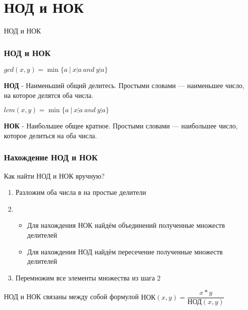 \section{НОД и НОК}


\begin{frame}
    \center \Huge НОД и НОК 
\end{frame}


\begin{frame}
	\frametitle{НОД и НОК}

    \quad  $gcd(x,y) = \min\{a~|~x \vdots a~and~y \vdots a\}$

    \quad \textbf{НОД} - Наименьший общий делитесь. Простыми словами --- наименьшее число, на которое делятся оба числа.

    \quad  $lcm(x,y) = \min\{a~|~x \vdots a~and~y \vdots a\}$

    \quad \textbf{НОК} - Наибольшее общее кратное. Простыми словами --- наибольшее число, которое делиться на оба числа.
\end{frame}


\begin{frame}
	\frametitle{Нахождение НОД и НОК}
    
    \quad Как найти НОД и НОК вручную?

    \begin{enumerate}
        \item Разложим оба числа в на простые делители

        \item 
            \begin{itemize}
                \item Для нахождения НОК найдём объединений полученные множеств делителей
                \item Для нахождения НОД найдём пересечение полученные множеств делителей
            \end{itemize}

        \item Перемножим все элементы множества из шага 2
    \end{enumerate}

    \quad НОД и НОК связаны между собой формулой $\text{НОК}(x,y)=\dfrac{x*y}{\text{НОД}(x,y)}$
\end{frame}


